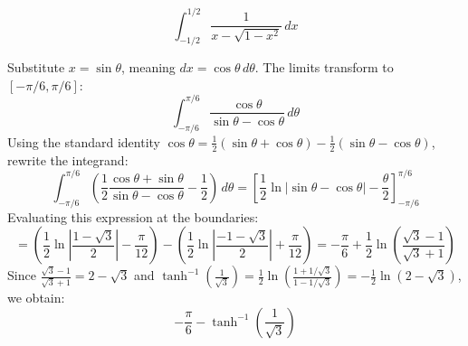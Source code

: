 \begin{questions}
    \question \[ \int_{-1/2}^{1/2} \frac{1}{x - \sqrt{1 - x^2}} \,dx \]
    \begin{solution}
        Substitute $x = \sin\theta$, meaning $dx = \cos\theta \,d\theta$. The limits transform to $[-\pi/6, \pi/6]$:
        \[ \int_{-\pi/6}^{\pi/6} \frac{\cos\theta}{\sin\theta - \cos\theta} \,d\theta \]
        Using the standard identity $\cos\theta = \frac{1}{2}(\sin\theta + \cos\theta) - \frac{1}{2}(\sin\theta - \cos\theta)$, rewrite the integrand:
        \[ \int_{-\pi/6}^{\pi/6} \left( \frac{1}{2}\frac{\cos\theta + \sin\theta}{\sin\theta - \cos\theta} - \frac{1}{2} \right) \,d\theta = \left[ \frac{1}{2}\ln|\sin\theta - \cos\theta| - \frac{\theta}{2} \right]_{-\pi/6}^{\pi/6} \]
        Evaluating this expression at the boundaries:
        \[ = \left( \frac{1}{2}\ln\left|\frac{1-\sqrt{3}}{2}\right| - \frac{\pi}{12} \right) - \left( \frac{1}{2}\ln\left|\frac{-1-\sqrt{3}}{2}\right| + \frac{\pi}{12} \right) = -\frac{\pi}{6} + \frac{1}{2}\ln\left(\frac{\sqrt{3}-1}{\sqrt{3}+1}\right) \]
        Since $\frac{\sqrt{3}-1}{\sqrt{3}+1} = 2-\sqrt{3}$ and $\tanh^{-1}\left(\frac{1}{\sqrt{3}}\right) = \frac{1}{2}\ln\left(\frac{1+1/\sqrt{3}}{1-1/\sqrt{3}}\right) = -\frac{1}{2}\ln(2-\sqrt{3})$, we obtain:
        \[ -\frac{\pi}{6} - \tanh^{-1}\left(\frac{1}{\sqrt{3}}\right) \]
    \end{solution}

\end{questions}

